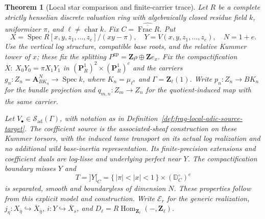 \documentclass[11pt]{article}
\newtheorem{theorem}{Theorem}[section]
\theoremstyle{definition}
\theoremstyle{remark}
\begin{document}
\begin{theorem}[Local star comparison and finite-carrier trace]
\label{thm:frag-node-complete-local-datum}
Let $R$ be a complete strictly henselian discrete valuation ring with
algebraically closed residue field $k$, uniformizer $\pi$, and
$\ell\ne\operatorname{char}k$.  Fix $C=\widehat{\overline{\operatorname{Frac}R}}$.
Put
\[
 X=\operatorname{Spec}R[x,y,z_1,\ldots,z_e]/(xy-\pi),\quad
 Y=V(x,y,z_1,\ldots,z_e),\quad N=1+e.
\]
Use the vertical log structure, compatible base roots, and the
relative Kummer tower of $x$; these fix the splitting
$P^{\mathrm{gp}}=\mathbf Z\rho\oplus\mathbf Z e_x$.
Fix the compactification
$\overline X:\ X_0Y_0=\pi X_1Y_1$ in
$(\mathbf P^1_R)^2\times(\mathbf P^1_R)^e$ and the carriers
$g_n:Z_n=\mathbf A^N_{BK_n}\to\operatorname{Spec}k$,
where $K_n=\mu_{\ell^n}$ and $\Gamma=\mathbf Z_\ell(1)$.
Write $p_n:Z_n\to BK_n$ for the bundle projection and
$q_{m,n}:Z_m\to Z_n$ for the quotient-induced map with the same carrier.

Let $V_\bullet\in\mathcal S_{\mathrm{ad}}(\Gamma)$, with notation
as in Definition~\ref{def:frag-local-adic-source-target}.
The coefficient source is the associated-sheaf construction on these
Kummer torsors, with the induced tame transport on its actual log
realization and no additional wild
base-inertia representation.  Its finite-precision extensions and
coefficient duals are log-lisse and underlying perfect near $Y$.
The compactification boundary misses $Y$ and
\[
 T=]Y[_C=\{\,|\pi|<|x|<1\,\}\times(\mathbb D^\circ_C)^e
\]
is separated, smooth and boundaryless of dimension $N$.
These properties follow from this explicit model and construction.
Write $\mathcal E_r$ for the generic realization,
$j_\eta:X_{\bar\eta}\hookrightarrow\overline X_{\bar\eta}$,
$i:Y\hookrightarrow\overline X_s$, and $D_\ell=R\operatorname{Hom}_{\mathbf Z_\ell}(-,\mathbf Z_\ell)$.


\end{theorem}
\end{document}
